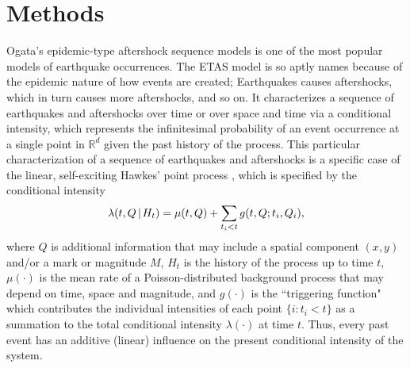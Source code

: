 \documentclass[11pt]{article}\usepackage[]{graphicx}\usepackage[]{color}
\let\originalleft\left
\let\originalright\right
\renewcommand{\left}{\mathopen{}\mathclose\bgroup\originalleft}
\renewcommand{\right}{\aftergroup\egroup\originalright}
\newcommand{\cond}{\,\left\vert\vphantom{}\right.}
\providecommand{\real}[1]{\mathbb{#1}}
\begin{document}
{%
\section{Methods}

Ogata's epidemic-type aftershock sequence models \citep{Ogata88,Ogata98} is one of the most popular models of earthquake occurrences. The ETAS model is so aptly names because of the epidemic nature of how events are created; Earthquakes causes aftershocks, which in turn causes more aftershocks, and so on. It characterizes a sequence of earthquakes and aftershocks over time or over space and time via a conditional intensity, which represents the infinitesimal probability of an event occurrence at a single point in $\real{R}^d$ given the past history of the process. This particular characterization of a sequence of earthquakes and aftershocks is a specific case of the linear, self-exciting Hawkes' point process \citep{Hawkes71}, which is specified by the conditional intensity
\begin{equation}\label{hawkes}
\lambda(t, Q \cond H_t) = \mu(t,Q) + \sum_{t_i < t} g(t,Q; t_i, Q_i),
\end{equation}
where $Q$ is additional information that may include a spatial component $(x,y)$ and/or a mark or magnitude $M$, $H_t$ is the history of the process up to time $t$, $\mu(\cdot)$ is the mean rate of a Poisson-distributed background process that may depend on time, space and magnitude, and $g(\cdot)$ is the ``triggering function" which contributes the individual intensities of each point $\{i: t_i < t\}$ as a summation to the total conditional intensity $\lambda(\cdot)$ at time $t$. Thus, every past event has an additive (linear) influence on the present conditional intensity of the system.

}
\end{document}
